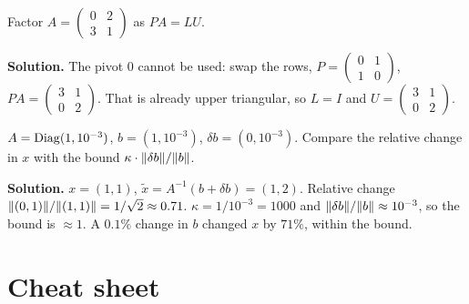 \begin{example}
Factor $A=\begin{pmatrix}0&2\\3&1\end{pmatrix}$ as $PA=LU$.

\textbf{Solution.} The pivot $0$ cannot be used: swap the rows, $P=\begin{pmatrix}0&1\\1&0\end{pmatrix}$, $PA=\begin{pmatrix}3&1\\0&2\end{pmatrix}$.
That is already upper triangular, so $L=I$ and $U=\begin{pmatrix}3&1\\0&2\end{pmatrix}$.
\end{example}

\begin{example}
$A=\operatorname{Diag}(1,10^{-3})$, $b=(1,10^{-3})$, $\delta b=(0,10^{-3})$. Compare the relative change in $x$ with the bound $\kappa\cdot\lVert \delta b\rVert/\lVert b\rVert$.

\textbf{Solution.} $x=(1,1)$, $\tilde x=A^{-1}(b+\delta b) = (1,2)$. Relative change $\lVert (0,1)\rVert/\lVert (1,1)\rVert = 1/\sqrt2\approx0.71$.
$\kappa=1/10^{-3}=1000$ and $\lVert \delta b\rVert/\lVert b\rVert\approx10^{-3}$, so the bound is $\approx1$. A $0.1\%$ change in $b$ changed $x$ by $71\%$, within the bound.
\end{example}

\section{Cheat sheet}


